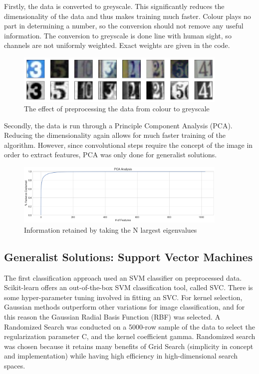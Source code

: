 \documentclass[11pt]{article}
\begin{document}
Firstly, the data is converted to greyscale. This significantly reduces the dimensionality of the data and thus makes training much faster. Colour plays no part in determining a number, so the conversion should not remove any useful information. The conversion to greyscale is done line with human sight, so channels are not uniformly weighted. Exact weights are given in the code.
\begin{figure}[h]
\caption{The effect of preprocessing the data from colour to greyscale}
\centering
\includegraphics[width=0.9\textwidth]{images/colour_to_greyscale.png}
\end{figure}

Secondly, the data is run through a Principle Component Analysis (PCA). Reducing the dimensionality again allows for much faster training of the algorithm. However, since convolutional steps require the concept of the image in order to extract features, PCA was only done for generalist solutions.
\begin{figure}[h]
\caption{Information retained by taking the N largest eigenvalues}
\centering
\includegraphics[width=0.9\textwidth]{images/pca_information_retention.png}
\end{figure}

\subsection{Generalist Solutions: Support Vector Machines}
The first classification approach used an SVM classifier on preprocessed data. Scikit-learn offers an out-of-the-box SVM classification tool, called SVC. There is some hyper-parameter tuning involved in fitting an SVC. For kernel selection, Gaussian methods outperform other variations for image classification\citep{svmkernels}, and for this reason the Gaussian Radial Basis Function (RBF) was selected. A Randomized Search was conducted on a 5000-row sample of the data to select the regularization parameter C, and the kernel coefficient gamma. Randomized search was chosen because it retains many benefits of Grid Search (simplicity in concept and implementation) while having high efficiency in high-dimensional search spaces.\\
\end{document}
